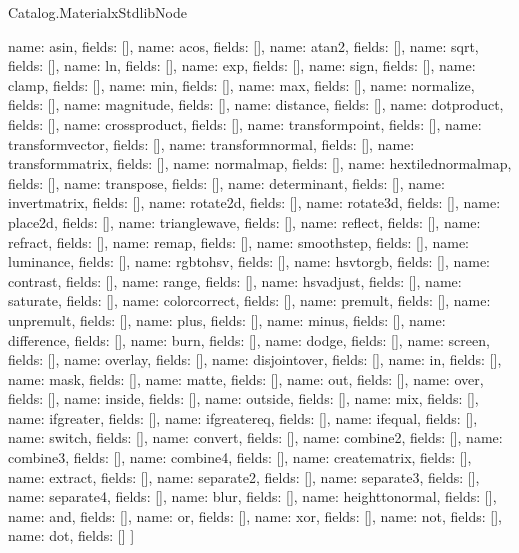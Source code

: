 \begin{lexlean}{Catalog.MaterialxStdlibNode}
\begin{semanticmodule}
{    {name: asin, fields: []},
    {name: acos, fields: []},
    {name: atan2, fields: []},
    {name: sqrt, fields: []},
    {name: ln, fields: []},
    {name: exp, fields: []},
    {name: sign, fields: []},
    {name: clamp, fields: []},
    {name: min, fields: []},
    {name: max, fields: []},
    {name: normalize, fields: []},
    {name: magnitude, fields: []},
    {name: distance, fields: []},
    {name: dotproduct, fields: []},
    {name: crossproduct, fields: []},
    {name: transformpoint, fields: []},
    {name: transformvector, fields: []},
    {name: transformnormal, fields: []},
    {name: transformmatrix, fields: []},
    {name: normalmap, fields: []},
    {name: hextilednormalmap, fields: []},
    {name: transpose, fields: []},
    {name: determinant, fields: []},
    {name: invertmatrix, fields: []},
    {name: rotate2d, fields: []},
    {name: rotate3d, fields: []},
    {name: place2d, fields: []},
    {name: trianglewave, fields: []},
    {name: reflect, fields: []},
    {name: refract, fields: []},
    {name: remap, fields: []},
    {name: smoothstep, fields: []},
    {name: luminance, fields: []},
    {name: rgbtohsv, fields: []},
    {name: hsvtorgb, fields: []},
    {name: contrast, fields: []},
    {name: range, fields: []},
    {name: hsvadjust, fields: []},
    {name: saturate, fields: []},
    {name: colorcorrect, fields: []},
    {name: premult, fields: []},
    {name: unpremult, fields: []},
    {name: plus, fields: []},
    {name: minus, fields: []},
    {name: difference, fields: []},
    {name: burn, fields: []},
    {name: dodge, fields: []},
    {name: screen, fields: []},
    {name: overlay, fields: []},
    {name: disjointover, fields: []},
    {name: in, fields: []},
    {name: mask, fields: []},
    {name: matte, fields: []},
    {name: out, fields: []},
    {name: over, fields: []},
    {name: inside, fields: []},
    {name: outside, fields: []},
    {name: mix, fields: []},
    {name: ifgreater, fields: []},
    {name: ifgreatereq, fields: []},
    {name: ifequal, fields: []},
    {name: switch, fields: []},
    {name: convert, fields: []},
    {name: combine2, fields: []},
    {name: combine3, fields: []},
    {name: combine4, fields: []},
    {name: creatematrix, fields: []},
    {name: extract, fields: []},
    {name: separate2, fields: []},
    {name: separate3, fields: []},
    {name: separate4, fields: []},
    {name: blur, fields: []},
    {name: heighttonormal, fields: []},
    {name: and, fields: []},
    {name: or, fields: []},
    {name: xor, fields: []},
    {name: not, fields: []},
    {name: dot, fields: []}
  ]
}
\end{semanticmodule}
\end{lexlean}
